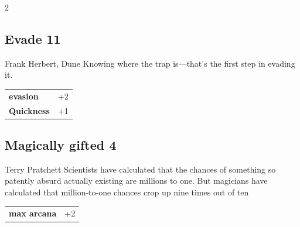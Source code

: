 \begin{multicols}{2}
\begin{tcolorbox}
\end{tcolorbox}

\begin{tcolorbox}
    \subsection*{Evade \hfill \small{11 }}
    \tcblower


\begin{pquote}{Frank Herbert, Dune}
Knowing where the trap is—that's the first step in evading it.
\end{pquote}

\vspace{3mm}

\begin{tabular}{@{}ll@{}}
    \textbf{evasion} & +2\\
    \textbf{Quickness} & +1\\
\end{tabular}


\end{tcolorbox}

\begin{tcolorbox}
    \subsection*{Magically gifted \hfill \small{4 }}
    \tcblower


\begin{pquote}{Terry Pratchett}
Scientists have calculated that the chances of something so patently absurd actually existing are millions to one. But magicians have calculated that million-to-one chances crop up nine times out of ten
\end{pquote}

\vspace{3mm}

\begin{tabular}{@{}ll@{}}
    \textbf{max arcana} & +2\\
\end{tabular}


\end{tcolorbox}


\end{multicols}
